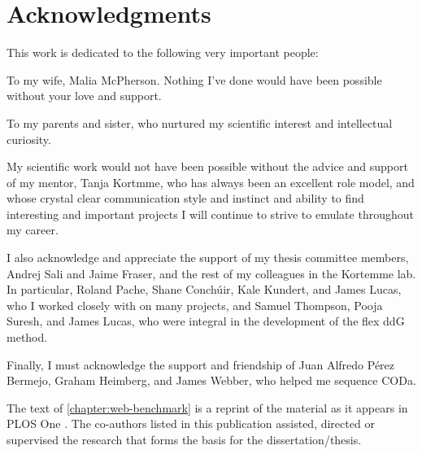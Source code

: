 \chapter*{Acknowledgments}

This work is dedicated to the following very important people:

To my wife, Malia McPherson. Nothing I've done would have been possible without your love and support.

To my parents and sister, who nurtured my scientific interest and intellectual curiosity.

My scientific work would not have been possible without the advice and support of my mentor, Tanja Kortmme, who has always been an excellent role model, and whose crystal clear communication style and instinct and ability to find interesting and important projects I will continue to strive to emulate throughout my career.

I also acknowledge and appreciate the support of my thesis committee members, Andrej Sali and Jaime Fraser, and the rest of my colleagues in the Kortemme lab.
In particular, Roland Pache, Shane Conch{\'u}ir, Kale Kundert, and James Lucas, who I worked closely with on many projects, and Samuel Thompson, Pooja Suresh, and James Lucas, who were integral in the development of the flex ddG method.

Finally, I must acknowledge the support and friendship of Juan Alfredo Pérez Bermejo, Graham Heimberg, and James Webber, who helped me sequence CODa.

The text of \ref{chapter:web-benchmark} is a reprint of the material as it appears in PLOS One \citet{conchuir_web_2015}. The co-authors listed in this publication assisted, directed or supervised the research that forms the basis for the dissertation/thesis.
